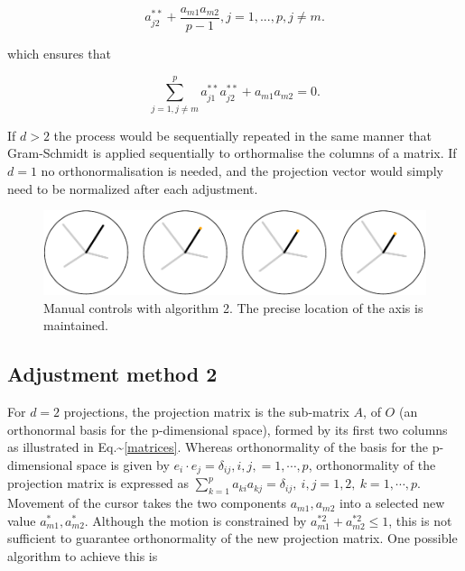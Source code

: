 \documentclass[]{interact}
\theoremstyle{plain}%
\theoremstyle{definition}
\theoremstyle{remark}
\begin{document}
\[a^{**}_{j2}+\frac{a_{m1}a_{m2}}{p-1}, j=1, ..., p, j\neq m.\]

which ensures that

\[\sum_{j=1, j\neq m}^p a^{**}_{j1}a^{**}_{j2} + a_{m1}a_{m2} = 0.\]

If \(d>2\) the process would be sequentially repeated in the same manner
that Gram-Schmidt is applied sequentially to orthormalise the columns of
a matrix. If \(d=1\) no orthonormalisation is needed, and the projection
vector would simply need to be normalized after each adjustment.

\begin{figure}
\includegraphics[width=1\linewidth]{appendix_files/figure-latex/othermethod-1} \caption{Manual controls with algorithm 2. The precise location of the axis is maintained.}\label{fig:othermethod}
\end{figure}

\hypertarget{adjustment-method-2}{%
\subsection{Adjustment method 2}\label{adjustment-method-2}}

For \(d=2\) projections, the projection matrix is the sub-matrix \(A\),
of \(O\) (an orthonormal basis for the p-dimensional space), formed by
its first two columns as illustrated in
Eq.\textasciitilde{}\ref{matrices}. Whereas orthonormality of the basis
for the p-dimensional space is given by
\(e_i\cdot e_j=\delta_{ij},{i,j,=1,\cdots, p}\), orthonormality of the
projection matrix is expressed as
\(\sum_{k=1}^p a_{ki} a_{kj}=\delta_{ij}, ~{i,j=1,2}, ~{k=1,\cdots,p}\).
Movement of the cursor takes the two components \({a_{m1},a_{m2}}\) into
a selected new value \({a^*_{m1},a^*_{m2}}\). Although the motion is
constrained by \(a^{*2}_{m1}+a^{*2}_{m2}\leq 1\), this is not sufficient
to guarantee orthonormality of the new projection matrix. One possible
algorithm to achieve this is
\end{document}
